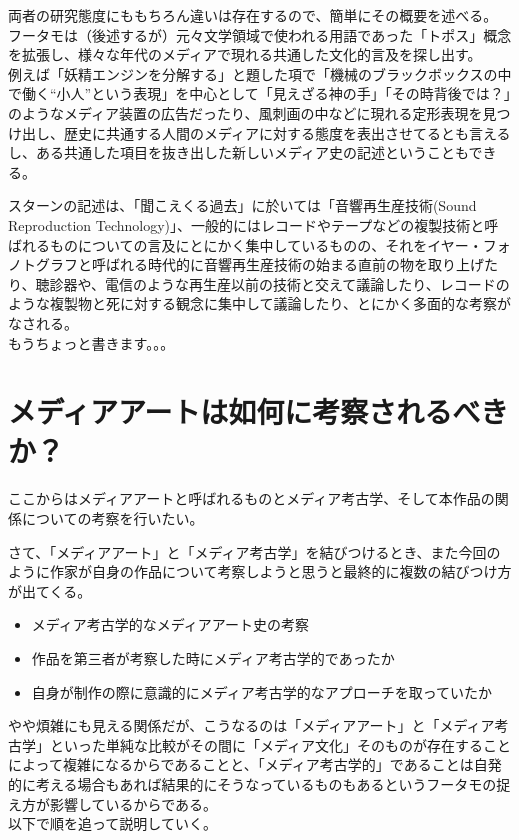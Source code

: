 両者の研究態度にももちろん違いは存在するので、簡単にその概要を述べる。\\
フータモは（後述するが）元々文学領域で使われる用語であった「トポス」概念を拡張し、様々な年代のメディアで現れる共通した文化的言及を探し出す。\\
例えば「妖精エンジンを分解する」と題した項で「機械のブラックボックスの中で働く``小人''という表現」を中心として「見えざる神の手」「その時背後では？」のようなメディア装置の広告だったり、風刺画の中などに現れる定形表現を見つけ出し、歴史に共通する人間のメディアに対する態度を表出させてるとも言えるし、ある共通した項目を抜き出した新しいメディア史の記述ということもできる。

スターンの記述は、「聞こえくる過去」に於いては「音響再生産技術(Sound
Reproduction
Technology)」、一般的にはレコードやテープなどの複製技術と呼ばれるものについての言及にとにかく集中しているものの、それをイヤー・フォノトグラフと呼ばれる時代的に音響再生産技術の始まる直前の物を取り上げたり、聴診器や、電信のような再生産以前の技術と交えて議論したり、レコードのような複製物と死に対する観念に集中して議論したり、とにかく多面的な考察がなされる。\\
もうちょっと書きます。。。

\section{メディアアートは如何に考察されるべきか？}\label{ux30e1ux30c7ux30a3ux30a2ux30a2ux30fcux30c8ux306fux5982ux4f55ux306bux8003ux5bdfux3055ux308cux308bux3079ux304dux304b}

ここからはメディアアートと呼ばれるものとメディア考古学、そして本作品の関係についての考察を行いたい。

さて、「メディアアート」と「メディア考古学」を結びつけるとき、また今回のように作家が自身の作品について考察しようと思うと最終的に複数の結びつけ方が出てくる。

\begin{itemize}
\tightlist
\item
  メディア考古学的なメディアアート史の考察
\item
  作品を第三者が考察した時にメディア考古学的であったか
\item
  自身が制作の際に意識的にメディア考古学的なアプローチを取っていたか
\end{itemize}

やや煩雑にも見える関係だが、こうなるのは「メディアアート」と「メディア考古学」といった単純な比較がその間に「メディア文化」そのものが存在することによって複雑になるからであることと、「メディア考古学的」であることは自発的に考える場合もあれば結果的にそうなっているものもあるというフータモの捉え方が影響しているからである。\\
以下で順を追って説明していく。


